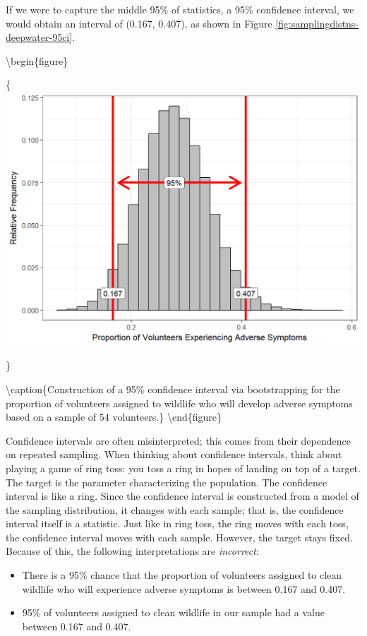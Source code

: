 \documentclass[]{book}
\providecommand{\tightlist}{%
  \setlength{\itemsep}{0pt}\setlength{\parskip}{0pt}}
\theoremstyle{definition}
\theoremstyle{definition}
\theoremstyle{remark}
\begin{document}
If we were to capture the middle 95\% of statistics, a 95\% confidence
interval, we would obtain an interval of (0.167, 0.407), as shown in
Figure \ref{fig:samplingdistns-deepwater-95ci}.

\textbackslash{}begin\{figure\}

\{\centering \includegraphics[width=0.8\linewidth]{./Images/samplingdistns-deepwater-95ci-1}

\}

\textbackslash{}caption\{Construction of a 95\% confidence interval via
bootstrapping for the proportion of volunteers assigned to wildlife who
will develop adverse symptoms based on a sample of 54
volunteers.\}\label{fig:samplingdistns-deepwater-95ci}
\textbackslash{}end\{figure\}

Confidence intervals are often misinterpreted; this comes from their
dependence on repeated sampling. When thinking about confidence
intervals, think about playing a game of ring toss: you toss a ring in
hopes of landing on top of a target. The target is the parameter
characterizing the population. The confidence interval is like a ring.
Since the confidence interval is constructed from a model of the
sampling distribution, it changes with each sample; that is, the
confidence interval itself is a statistic. Just like in ring toss, the
ring moves with each toss, the confidence interval moves with each
sample. However, the target stays fixed. Because of this, the following
interpretations are \emph{incorrect}:

\begin{itemize}
\tightlist
\item
  There is a 95\% chance that the proportion of volunteers assigned to
  clean wildlife who will experience adverse symptoms is between 0.167
  and 0.407.
\item
  95\% of volunteers assigned to clean wildlife in our sample had a
  value between 0.167 and 0.407.
\end{itemize}
\end{document}

